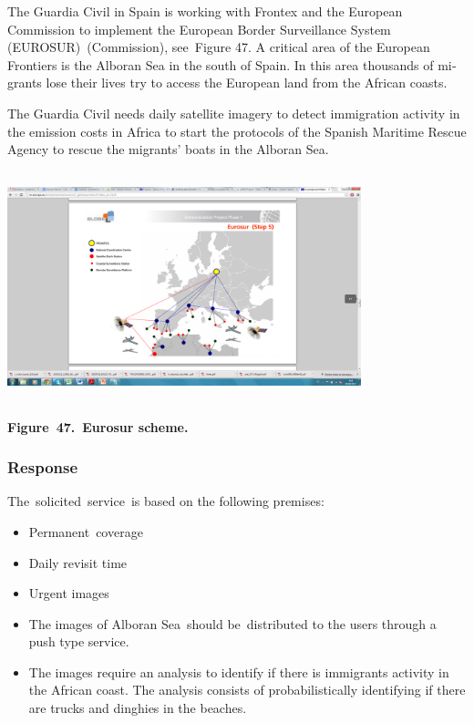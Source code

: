 \documentclass[a4paper]{article}
\newcommand\liststyleLFOvii{%
\renewcommand\labelitemi{[F0B7?]}
\renewcommand\labelitemii{o}
\renewcommand\labelitemiii{[F0A7?]}
\renewcommand\labelitemiv{[F0B7?]}
}
\begin{document}
\foreignlanguage{english}{The Guardia Civil in Spain is working with
Frontex and the European Commission to implement the European Border
Surveillance System (EUROSUR)\ }(Commission)\foreignlanguage{english}{,
see\ }Figure 47\foreignlanguage{english}{. A critical area of the
European Frontiers is the Alboran Sea in the south of Spain. In this
area thousands of migrants lose their lives try to access the European
land from the African coasts.}


\bigskip

{
The Guardia Civil needs daily satellite imagery to detect immigration
activity in the emission costs in Africa to start the protocols of the
Spanish Maritime Rescue Agency to rescue the migrants{\textquoteright}
boats in the Alboran Sea.}


\bigskip

{\centering 
\includegraphics[width=4.04209in,height=2.62667in]{out-img55.png} \par}

{\centering\bfseries
\label{bkm:Ref377552833}Figure\ 47.\ Eurosur scheme.
\par}


\bigskip

\subsubsection[Response]{Response}
\hypertarget{Toc381777262}{}
\bigskip

{
The\ solicited\ service\ is based on the following premises:}

\liststyleLFOvii
\begin{itemize}
\item {
Permanent\ coverage\ }
\item {
Daily revisit time}
\item {
Urgent images}
\item {
The images of Alboran Sea\ should be\ distributed to the users through a
push type service.}
\item {
The images require an analysis to identify if there is immigrants
activity in the African coast. The analysis consists of
probabilistically identifying if there are trucks and dinghies in the
beaches.}
\end{itemize}
\end{document}
